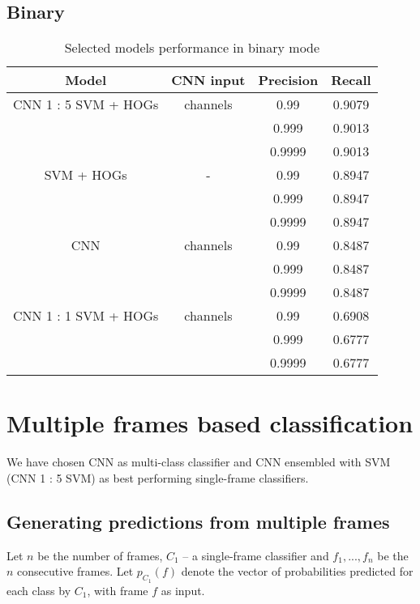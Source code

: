         \subsection{Binary}
        \begin{table}[H]
        \begin{center}
        \small
        \caption{Selected models performance in binary mode}
        \begin{tabular}{ |c|c|c|c| }
            \hline
            Model & CNN input & Precision & Recall\\
        \hline
        CNN 1 : 5 SVM + HOGs & channels & 0.99 & 0.9079\\
        & & 0.999 & 0.9013\\
        & & 0.9999 & 0.9013\\
        \hline
        SVM + HOGs & - & 0.99 & 0.8947 \\
        & & 0.999 & 0.8947\\
        & & 0.9999 & 0.8947\\
        \hline
        CNN & channels & 0.99 & 0.8487 \\
        & & 0.999 & 0.8487\\
        & & 0.9999 & 0.8487\\
        \hline
        CNN 1 : 1 SVM + HOGs & channels & 0.99 & 0.6908\\
        & & 0.999 & 0.6777\\
        & & 0.9999 & 0.6777\\
        \hline

        \end{tabular}
        \end{center}
        \end{table}

    \section{Multiple frames based classification}
    We have chosen CNN as multi-class classifier and CNN ensembled with SVM (CNN 1 : 5 SVM) as
    best performing single-frame classifiers.

    \subsection{Generating predictions from multiple frames}
    Let $n$ be the number of frames, $C_{1}$ -- a single-frame classifier and
    $f_1, ..., f_n$ be the $n$ consecutive frames.
    Let $p_{C_{1}}(f)$ denote the vector of probabilities predicted for each class by $C_{1}$,
    with frame $f$ as input.

